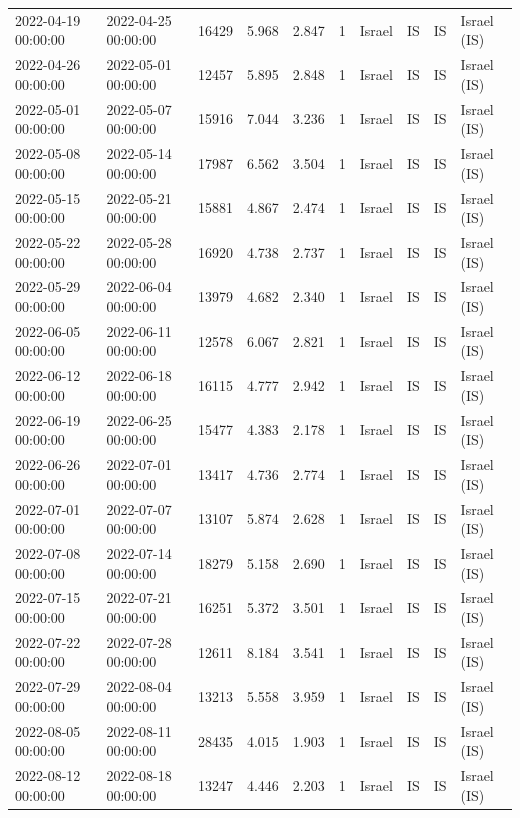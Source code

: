 \begin{tabular}{llrrrlllll}
2022-04-19 00:00:00 & 2022-04-25 00:00:00 & 16429 & 5.968 & 2.847 & 1 & Israel & IS & IS & Israel (IS) \\
2022-04-26 00:00:00 & 2022-05-01 00:00:00 & 12457 & 5.895 & 2.848 & 1 & Israel & IS & IS & Israel (IS) \\
2022-05-01 00:00:00 & 2022-05-07 00:00:00 & 15916 & 7.044 & 3.236 & 1 & Israel & IS & IS & Israel (IS) \\
2022-05-08 00:00:00 & 2022-05-14 00:00:00 & 17987 & 6.562 & 3.504 & 1 & Israel & IS & IS & Israel (IS) \\
2022-05-15 00:00:00 & 2022-05-21 00:00:00 & 15881 & 4.867 & 2.474 & 1 & Israel & IS & IS & Israel (IS) \\
2022-05-22 00:00:00 & 2022-05-28 00:00:00 & 16920 & 4.738 & 2.737 & 1 & Israel & IS & IS & Israel (IS) \\
2022-05-29 00:00:00 & 2022-06-04 00:00:00 & 13979 & 4.682 & 2.340 & 1 & Israel & IS & IS & Israel (IS) \\
2022-06-05 00:00:00 & 2022-06-11 00:00:00 & 12578 & 6.067 & 2.821 & 1 & Israel & IS & IS & Israel (IS) \\
2022-06-12 00:00:00 & 2022-06-18 00:00:00 & 16115 & 4.777 & 2.942 & 1 & Israel & IS & IS & Israel (IS) \\
2022-06-19 00:00:00 & 2022-06-25 00:00:00 & 15477 & 4.383 & 2.178 & 1 & Israel & IS & IS & Israel (IS) \\
2022-06-26 00:00:00 & 2022-07-01 00:00:00 & 13417 & 4.736 & 2.774 & 1 & Israel & IS & IS & Israel (IS) \\
2022-07-01 00:00:00 & 2022-07-07 00:00:00 & 13107 & 5.874 & 2.628 & 1 & Israel & IS & IS & Israel (IS) \\
2022-07-08 00:00:00 & 2022-07-14 00:00:00 & 18279 & 5.158 & 2.690 & 1 & Israel & IS & IS & Israel (IS) \\
2022-07-15 00:00:00 & 2022-07-21 00:00:00 & 16251 & 5.372 & 3.501 & 1 & Israel & IS & IS & Israel (IS) \\
2022-07-22 00:00:00 & 2022-07-28 00:00:00 & 12611 & 8.184 & 3.541 & 1 & Israel & IS & IS & Israel (IS) \\
2022-07-29 00:00:00 & 2022-08-04 00:00:00 & 13213 & 5.558 & 3.959 & 1 & Israel & IS & IS & Israel (IS) \\
2022-08-05 00:00:00 & 2022-08-11 00:00:00 & 28435 & 4.015 & 1.903 & 1 & Israel & IS & IS & Israel (IS) \\
2022-08-12 00:00:00 & 2022-08-18 00:00:00 & 13247 & 4.446 & 2.203 & 1 & Israel & IS & IS & Israel (IS) \\

\end{tabular}
